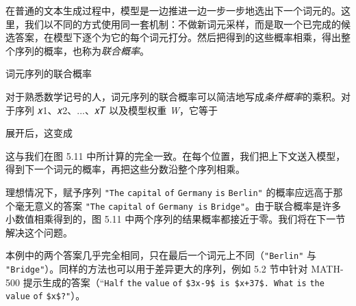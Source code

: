 在普通的文本生成过程中，模型是一边推进一边一步一步地选出下一个词元的。这里，我们以不同的方式使用同一套机制：不做新词元采样，而是取一个已完成的候选答案，在模型下逐个为它的每个词元打分。然后把得到的这些概率相乘，得出整个序列的概率，也称为\emph{联合概率}。

\begin{mySidebar}{词元序列的联合概率}

对于熟悉数学记号的人，词元序列的联合概率可以简洁地写成\emph{条件概率}的乘积。对于序列 𝑥1、𝑥2、...、𝑥𝑇 以及模型权重 \emph{W}，它等于

\end{mySidebar}


\begin{mySidebarBox}

展开后，这变成

\end{mySidebarBox}


\begin{mySidebarBox}

这与我们在图 5.11 中所计算的完全一致。在每个位置，我们把上下文送入模型，得到下一个词元的概率，再把这些分数沿整个序列相乘。

\end{mySidebarBox}

理想情况下，赋予序列 \texttt{"}\texttt{The} \texttt{capital} \texttt{of} \texttt{Germany} \texttt{is} \texttt{Berlin}\texttt{"} 的概率应远高于那个毫无意义的答案 \texttt{"}\texttt{The} \texttt{capital} \texttt{of} \texttt{Germany is} \texttt{Bridge}\texttt{"}。由于联合概率是许多小数值相乘得到的，图 5.11 中两个序列的结果概率都接近于零。我们将在下一节解决这个问题。

本例中的两个答案几乎完全相同，只在最后一个词元上不同（\texttt{"}\texttt{Berlin}\texttt{"} 与 \texttt{"}\texttt{Bridge}\texttt{"}）。同样的方法也可以用于差异更大的序列，例如 5.2 节中针对 MATH-500 提示生成的答案（“\texttt{Half} \texttt{the} \texttt{value} \texttt{of} \texttt{\$3x-9\$ is \$x+37\$. What} \texttt{is} \texttt{the} \texttt{value} \texttt{of} \texttt{\$x\$?}\texttt{"}）。

